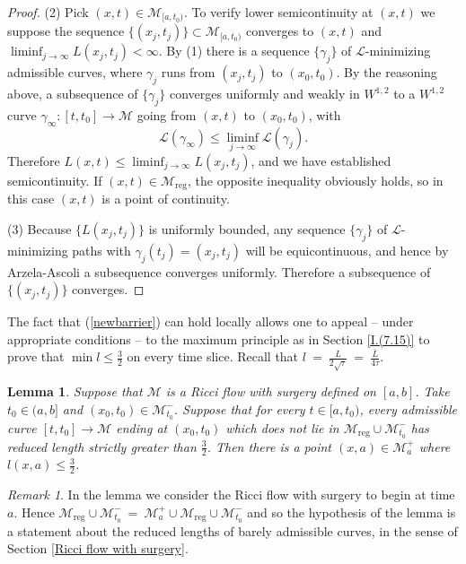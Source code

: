 \documentclass[12pt]{amsart}
\renewcommand{\L}{{\mathcal L}}
\newcommand{\M}{{\mathcal M}}
\newcommand{\reg}{\operatorname{reg}}
\newcommand{\ga}{\gamma}
\newcommand{\ra}{\rightarrow}
\numberwithin{equation}{section}
\theoremstyle{plain}
\newtheorem{lemma}[equation]{Lemma}
\theoremstyle{definition}
\theoremstyle{remark}
\newtheorem{remark}[equation]{Remark}
\begin{document}
\begin{proof}
(2) Pick $(x,t)\in\M_{[a,t_0)}$.  To verify lower semicontinuity at 
$(x,t)$ we suppose the sequence $\{(x_j,t_j)\}\subset \M_{[a,t_0)}$ 
converges to $(x,t)$
and $\liminf_{j\ra\infty}L(x_j,t_j)<\infty$.   By (1) there is a sequence 
$\{\ga_j\}$ of $\L$-minimizing admissible curves, where
$\ga_j$ runs from $(x_j,t_j)$ to $(x_0,t_0)$.  By the reasoning above,
a subsequence of $\{\ga_j\}$ converges uniformly and weakly in $W^{1,2}$ to a $W^{1,2}$
curve $\ga_\infty:[t,t_0]\ra\M$ going from $(x,t)$ to $(x_0,t_0)$, with 
\begin{equation}
\L(\ga_\infty)\leq \liminf_{j\ra\infty}\L(\ga_j).
\end{equation}
Therefore $L(x,t)\leq \liminf_{j\ra\infty} L(x_j,t_j)$, and we have established
semicontinuity.  If 
$(x,t)\in \M_{\reg}$,
the opposite inequality obviously
holds, so in this case $(x,t)$ is a point of continuity.

(3) Because $\{L(x_j,t_j)\}$ is uniformly bounded,  any sequence $\{\ga_j\}$ of $\L$-minimizing
paths with $\ga_j(t_j)=(x_j,t_j)$ will be equicontinuous, and hence by Arzela-Ascoli
a subsequence converges uniformly.  Therefore a subsequence of $\{(x_j,t_j)\}$ converges.
\end{proof}

The fact that (\ref{newbarrier}) can hold locally allows one
to appeal -- under appropriate conditions -- to the maximum
principle as in Section \ref{I.(7.15)} to prove
that $\min l\leq \frac{3}{2}$ on 
every time slice. 
Recall that $l \: = \: \frac{L}{2\sqrt{\tau}} \: = \: 
\frac{\overline{L}}{4\tau}$.


\begin{lemma}
\label{stillleq3/2}
Suppose that $\M$ is a Ricci flow with surgery defined on $ [a,b]$.
Take 
$t_0\in (a,b]$
and $(x_0,t_0)\in \M_{t_0}^-$.  Suppose that
for every $t \in [a, t_0)$, every admissible curve
$[t,t_0]\ra\M$ ending at $(x_0,t_0)$ which does not lie
in 
$\M_{\reg}\cup  \M_{t_0}^-$
has reduced length strictly greater than $\frac{3}{2}$. Then
there is a point $(x,a)\in \M_a^+$ where $l(x,a)\leq \frac{3}{2}$.
\end{lemma}
\begin{remark}
In the lemma we consider the Ricci flow with surgery to begin at time $a$.
Hence $\M_{\reg}\cup  \M_{t_0}^- \: = \: \M_a^+ \cup \M_{\reg}\cup  \M_{t_0}^-$
and so the hypothesis of the lemma is a statement about the reduced
lengths of barely admissible curves, in the sense of Section 
\ref{Ricci flow with surgery}.
\end{remark}
\end{document}
